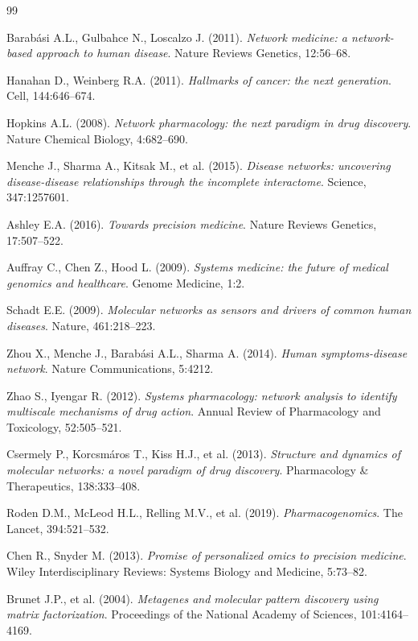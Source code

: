 \begin{thebibliography}{99}

 Barabási A.L., Gulbahce N., Loscalzo J. (2011). \textit{Network medicine: a network-based approach to human disease}. Nature Reviews Genetics, 12:56--68.

 Hanahan D., Weinberg R.A. (2011). \textit{Hallmarks of cancer: the next generation}. Cell, 144:646--674.

 Hopkins A.L. (2008). \textit{Network pharmacology: the next paradigm in drug discovery}. Nature Chemical Biology, 4:682--690.

 Menche J., Sharma A., Kitsak M., et al. (2015). \textit{Disease networks: uncovering disease-disease relationships through the incomplete interactome}. Science, 347:1257601.

 Ashley E.A. (2016). \textit{Towards precision medicine}. Nature Reviews Genetics, 17:507--522.

 Auffray C., Chen Z., Hood L. (2009). \textit{Systems medicine: the future of medical genomics and healthcare}. Genome Medicine, 1:2.

 Schadt E.E. (2009). \textit{Molecular networks as sensors and drivers of common human diseases}. Nature, 461:218--223.

 Zhou X., Menche J., Barabási A.L., Sharma A. (2014). \textit{Human symptoms-disease network}. Nature Communications, 5:4212.

 Zhao S., Iyengar R. (2012). \textit{Systems pharmacology: network analysis to identify multiscale mechanisms of drug action}. Annual Review of Pharmacology and Toxicology, 52:505--521.

 Csermely P., Korcsmáros T., Kiss H.J., et al. (2013). \textit{Structure and dynamics of molecular networks: a novel paradigm of drug discovery}. Pharmacology \& Therapeutics, 138:333--408.

 Roden D.M., McLeod H.L., Relling M.V., et al. (2019). \textit{Pharmacogenomics}. The Lancet, 394:521--532.

 Chen R., Snyder M. (2013). \textit{Promise of personalized omics to precision medicine}. Wiley Interdisciplinary Reviews: Systems Biology and Medicine, 5:73--82.

 Brunet J.P., et al. (2004). \textit{Metagenes and molecular pattern discovery using matrix factorization}. Proceedings of the National Academy of Sciences, 101:4164--4169.


\end{thebibliography}
